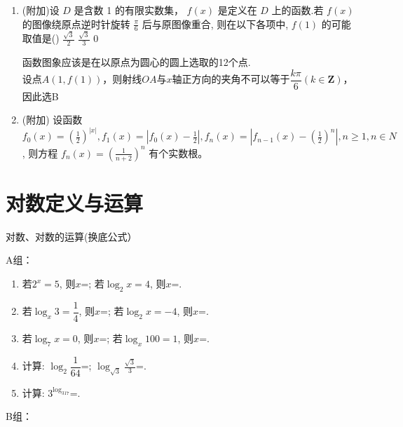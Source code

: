 \begin{enumerate}
\item (附加)设 $D$ 是含数 1 的有限实数集， $f(x)$ 是定义在 $D$ 上的函数.若 $f(x)$ 的图像绕原点逆时针旋转 $\frac{\pi}{6}$ 后与原图像重合, 则在以下各项中, $f(1)$ 的可能取值是\dotfill()
{$\frac{\sqrt{3}}{2}$}
{$\frac{\sqrt{3}}{3}$}
{0}
\begin{jieda}
    函数图象应该是在以原点为圆心的圆上选取的12个点.\\
    设点$A(1, f(1))$，则射线$OA$与$x$轴正方向的夹角不可以等于$\dfrac{k\pi}{6}(k \in \mathbf{Z})$，因此选B
\end{jieda}


\item (附加) 设函数 $f_0(x)=\left(\frac{1}{2}\right)^{|x|}, f_1(x)=\left|f_0(x)-\frac{1}{2}\right|, f_n(x)=\left|f_{n-1}(x)-\left(\frac{1}{2}\right)^n\right|, n \geq 1, n \in N$, 则方程 $f_n(x)=\left(\frac{1}{n+2}\right)^n$ 有个实数根。


\end{enumerate}

\section*{对数定义与运算}

\zsd 对数、对数的运算(换底公式）

A组：

\begin{enumerate}
\item 若$2^x=5$, 则$x$=; 若$\log_2x=4$, 则$x$=. 

\item 若$\log_x3=\dfrac{1}{4}$, 则$x$=; 若$\log_2x=-4$, 则$x$=. 

\item 若$\log_7x=0$, 则$x$=; 若$\log_x100=1$, 则$x$=. 

\item 计算: $\log_2\dfrac{1}{64}$=; $\log_{\sqrt{3}}\frac{\sqrt{3}}{3}$=. 

\item 计算: $3^{\log_317}$=. 


\end{enumerate}


B组：


